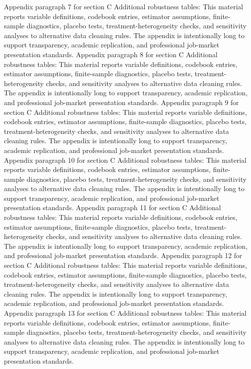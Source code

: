 \documentclass[preprint,12pt]{elsarticle}
\begin{document}
Appendix paragraph 7 for section C Additional robustness tables: This material reports variable definitions, codebook entries, estimator assumptions, finite-sample diagnostics, placebo tests, treatment-heterogeneity checks, and sensitivity analyses to alternative data cleaning rules. The appendix is intentionally long to support transparency, academic replication, and professional job-market presentation standards.
Appendix paragraph 8 for section C Additional robustness tables: This material reports variable definitions, codebook entries, estimator assumptions, finite-sample diagnostics, placebo tests, treatment-heterogeneity checks, and sensitivity analyses to alternative data cleaning rules. The appendix is intentionally long to support transparency, academic replication, and professional job-market presentation standards.
Appendix paragraph 9 for section C Additional robustness tables: This material reports variable definitions, codebook entries, estimator assumptions, finite-sample diagnostics, placebo tests, treatment-heterogeneity checks, and sensitivity analyses to alternative data cleaning rules. The appendix is intentionally long to support transparency, academic replication, and professional job-market presentation standards.
Appendix paragraph 10 for section C Additional robustness tables: This material reports variable definitions, codebook entries, estimator assumptions, finite-sample diagnostics, placebo tests, treatment-heterogeneity checks, and sensitivity analyses to alternative data cleaning rules. The appendix is intentionally long to support transparency, academic replication, and professional job-market presentation standards.
Appendix paragraph 11 for section C Additional robustness tables: This material reports variable definitions, codebook entries, estimator assumptions, finite-sample diagnostics, placebo tests, treatment-heterogeneity checks, and sensitivity analyses to alternative data cleaning rules. The appendix is intentionally long to support transparency, academic replication, and professional job-market presentation standards.
Appendix paragraph 12 for section C Additional robustness tables: This material reports variable definitions, codebook entries, estimator assumptions, finite-sample diagnostics, placebo tests, treatment-heterogeneity checks, and sensitivity analyses to alternative data cleaning rules. The appendix is intentionally long to support transparency, academic replication, and professional job-market presentation standards.
Appendix paragraph 13 for section C Additional robustness tables: This material reports variable definitions, codebook entries, estimator assumptions, finite-sample diagnostics, placebo tests, treatment-heterogeneity checks, and sensitivity analyses to alternative data cleaning rules. The appendix is intentionally long to support transparency, academic replication, and professional job-market presentation standards.
\end{document}
